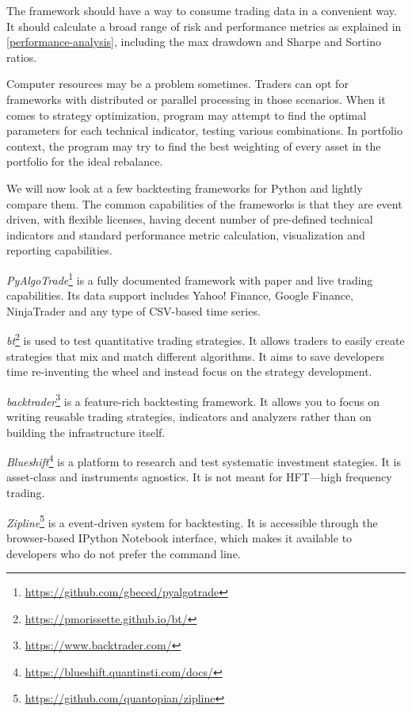 The framework should have a way to consume trading data in a convenient way. It should calculate a broad range of risk and performance metrics as explained in \ref{performance-analysis}, including the max drawdown and Sharpe and Sortino ratios.

Computer resources may be a problem sometimes. Traders can opt for frameworks with distributed or parallel processing in those scenarios. When it comes to strategy optimization, program may attempt to find the optimal parameters for each technical indicator, testing various combinations. In portfolio context, the program may try to find the best weighting of every asset in the portfolio for the ideal rebalance.

We will now look at a few backtesting frameworks for Python and lightly compare them. The common capabilities of the frameworks is that they are event driven, with flexible licenses, having decent number of pre-defined technical indicators and standard performance metric calculation, visualization and reporting capabilities.

\emph{PyAlgoTrade}\footnote{\url{https://github.com/gbeced/pyalgotrade}} is a fully documented framework with paper and live trading capabilities. Its data support includes Yahoo! Finance, Google Finance, NinjaTrader and any type of CSV-based time series.

\emph{bt}\footnote{\url{https://pmorissette.github.io/bt/}} is used to test quantitative trading strategies. It allows traders to easily create strategies that mix and match different algorithms. It aims to save developers time re-inventing the wheel and instead focus on the strategy development.

\emph{backtrader}\footnote{\url{https://www.backtrader.com/}} is a feature-rich backtesting framework. It allows you to focus on writing reusable trading strategies, indicators and analyzers rather than on building the infrastructure itself.

\emph{Blueshift}\footnote{\url{https://blueshift.quantinsti.com/docs/}} is a platform to research and test systematic investment stategies. It is asset-class and instruments agnostics. It is not meant for HFT---high frequency trading.

\emph{Zipline}\footnote{\url{https://github.com/quantopian/zipline}} is a event-driven system for backtesting. It is accessible through the browser-based IPython Notebook interface, which makes it available to developers who do not prefer the command line.


